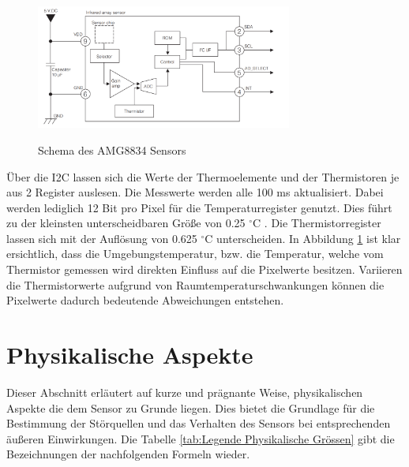 \begin{figure}[H]
	\centering
	\includegraphics[width=0.75\textwidth]
	{fig/Circuit_AMG8834.PNG}
	\caption[Schema des AMG8834 Sensors]{Schema des AMG8834 Sensors} \protect\cite{AMG8834}
	\label{fig:SchemaAMG8834}
\end{figure}
 
Über die \ac{I2C} lassen sich die Werte der Thermoelemente und der Thermistoren je aus 2 Register auslesen. Die Messwerte werden alle 100 ms aktualisiert. Dabei werden lediglich 12 Bit pro Pixel für die Temperaturregister genutzt. Dies führt zu der kleinsten unterscheidbaren Größe von 0.25 $^\circ$C . Die Thermistorregister lassen sich mit der Auflösung von 0.625 $^\circ$C unterscheiden. In Abbildung \ref{fig:SchemaAMG8834} ist klar ersichtlich, dass die Umgebungstemperatur, bzw. die Temperatur, welche vom Thermistor gemessen wird direkten Einfluss auf die Pixelwerte besitzen. Variieren die Thermistorwerte aufgrund von Raumtemperaturschwankungen können die Pixelwerte dadurch bedeutende Abweichungen entstehen.

\section{Physikalische Aspekte}
\label{sec:Physik}
Dieser Abschnitt erläutert auf kurze und prägnante Weise, physikalischen Aspekte die dem Sensor zu Grunde liegen. Dies bietet die Grundlage für die Bestimmung der Störquellen und das Verhalten des Sensors bei entsprechenden äußeren Einwirkungen. Die Tabelle \ref{tab:Legende Physikalische Grössen} gibt die Bezeichnungen der nachfolgenden Formeln wieder.

